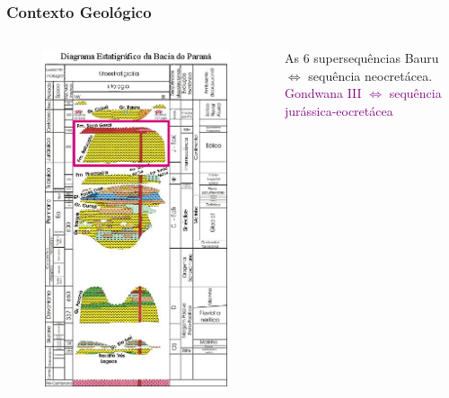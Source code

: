 \documentclass[10pt]{beamer} %
\begin{document}
\begin{frame}
	\frametitle{Contexto Geológico}
	\begin{columns}
		\begin{column}{0.4\textwidth}
			\begin{figure}
				\includegraphics[scale=0.36]{Imagens/diagramagondwanaiii.png}
			\end{figure}
		\end{column}
		\begin{column}{0.75\textwidth}
			\begin{block}{As $6$ supersequências}
				Bauru $\Longleftrightarrow$  sequência neocretácea.\\
				\textcolor{purple}{Gondwana III $\Longleftrightarrow$ sequência jurássica-eocretácea}\\

\end{block}
\end{column}
\end{columns}
\end{frame}
\end{document}
